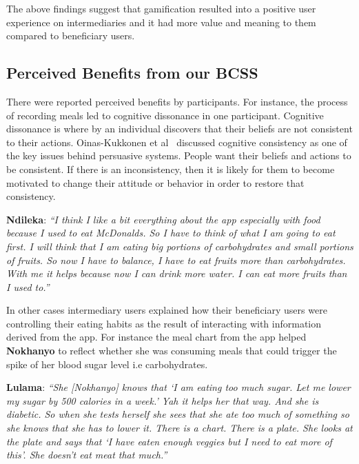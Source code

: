 \documentclass{sig-alternate}
\begin{document}
The above findings suggest that gamification resulted into a positive user 
experience on intermediaries and it had more value and meaning to them 
compared to beneficiary users.

\subsection{Perceived Benefits from our BCSS}

There were reported perceived benefits by participants. For instance, the
process of recording meals led to cognitive dissonance in one participant.
Cognitive dissonance is where by an individual discovers that their beliefs
are not consistent to their actions. Oinas-Kukkonen et 
al~\cite{Oinas-kukkonen:psd} discussed cognitive consistency as 
one of the key issues behind
persuasive systems. People want their beliefs and actions to be consistent. If
there is an inconsistency, then it is likely  for them to become motivated to
change their attitude or behavior in order to restore that consistency.

\textbf{Ndileka}: \textit{``I think I like a bit everything about the app 
especially with food because I used to eat McDonalds. So I have to think of 
what I am going to eat first. I will think that I am eating big portions of 
carbohydrates and small portions of fruits. So now I have to balance, I 
have to eat fruits more than carbohydrates. With me it helps because now I 
can drink more water. I can eat more fruits than I used to.''}

In other cases intermediary users explained how their beneficiary users were
controlling their eating habits as the result of interacting with information
derived from the app. For instance the meal chart from the app helped
\textbf{Nokhanyo} to reflect whether she was consuming meals that could
trigger the spike of her blood sugar level i.e carbohydrates.

\textbf{Lulama}: \textit{``She [Nokhanyo] knows that `I am eating too 
much sugar. Let me lower my sugar by 500 calories in a week.' Yah it 
helps her that way. And she is diabetic. So when she tests herself she 
sees that she ate too much of something so she knows that she has to 
lower it. There is a chart. There is a plate. She looks at the plate and 
says that `I have eaten enough veggies but I need to eat more of this'. 
She doesn't eat meat that much.''}
\end{document}
